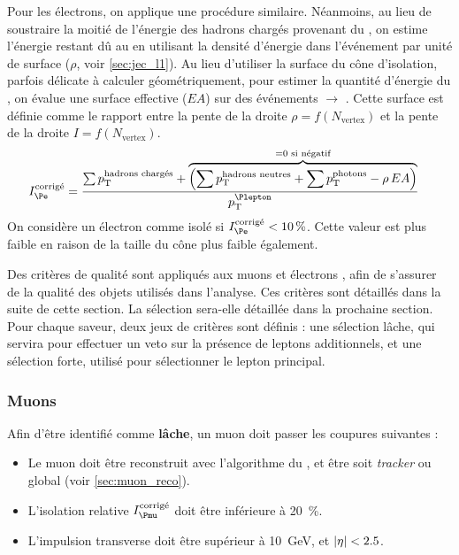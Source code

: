 Pour les électrons, on applique une procédure similaire. Néanmoins, au lieu de soustraire la moitié de l'énergie des hadrons chargés provenant du \pu, on estime l'énergie restant dû au \pu en utilisant la densité d'énergie dans l'événement par unité de surface ($\rho$, voir \cref{sec:jec_l1}). Au lieu d'utiliser la surface du cône d'isolation, parfois délicate à calculer géométriquement, pour estimer la quantité d'énergie du \pu, on évalue une surface effective ($EA$) sur des événements \PZ $\rightarrow$ \Pelectron{}\Ppositron. Cette surface est définie comme le rapport entre la pente de la droite $\rho = f(N_{\text{vertex}})$ et la pente de la droite $I = f(N_\text{vertex})$. 
\begin{align*}
  I_{\Pe}^\text{corrigé} &= \frac{\sum{\pt^\text{hadrons chargés}} + \overbrace{\left(\sum{\pt^\text{hadrons neutres}} + \sum{\pt^\text{photons}} - \rho\,EA \right)}^{= 0 \text{ si négatif}}}{\pt^{\Plepton}}
\end{align*}
On considère un électron comme isolé si $I_{\Pe}^\text{corrigé} < \SI{10}{\%}$. Cette valeur est plus faible en raison de la taille du cône plus faible également.

\bigskip

Des critères de qualité sont appliqués aux muons et électrons \pf, afin de s'assurer de la qualité des objets utilisés dans l'analyse. Ces critères sont détaillés dans la suite de cette section. La sélection sera-elle détaillée dans la prochaine section. Pour chaque saveur, deux jeux de critères sont définis : une sélection lâche, qui servira pour effectuer un veto sur la présence de leptons additionnels, et une sélection forte, utilisé pour sélectionner le lepton principal.

\subsubsection{Muons} \label{sec:sel_muon}

Afin d'être identifié comme \textbf{lâche}, un muon doit passer les coupures suivantes :
\begin{itemize}
    \item Le muon doit être reconstruit avec l'algorithme du \pf, et être soit \emph{tracker} ou global (voir \cref{sec:muon_reco}).
    \item L'isolation relative $I_{\Pmu}^\text{corrigé}$ doit être inférieure à \SI{20}{\%}.
    \item L'impulsion transverse doit être supérieur à \SI{10}{\GeV}, et $\lvert \eta \rvert < \num{2.5}$.
\end{itemize}

